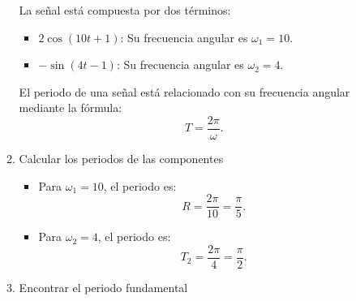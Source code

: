 \begin{enumerate}[label=\color{red}\textbf{\arabic*)}]
\begin{enumerate}[label=Paso \arabic*:]
                La señal está compuesta por dos términos:
                \begin{itemize}[label=\textbullet]
                    \item $2\cos(10t+1)$: Su frecuencia angular es $\omega_1=10$.
                    \item $-\sin(4t-1)$: Su frecuencia angular es $\omega_2=4$.
                \end{itemize}
                El periodo de una señal está relacionado con su frecuencia angular mediante la fórmula: \[
                T=\dfrac{2\pi}{\omega}.
                \] 
            \item Calcular los periodos de las componentes
                \begin{itemize}[label=\textbullet]
                    \item Para $\omega_1=10$, el periodo es: \[
                    R=\dfrac{2\pi}{10}=\dfrac{\pi}{5}.
                    \] 
                \item Para $\omega_2=4$, el periodo es: \[
                T_2=\dfrac{2\pi}{4}=\dfrac{\pi}{2}.
                \] 
                \end{itemize}
            \item Encontrar el periodo fundamental


\end{enumerate}
\end{enumerate}
